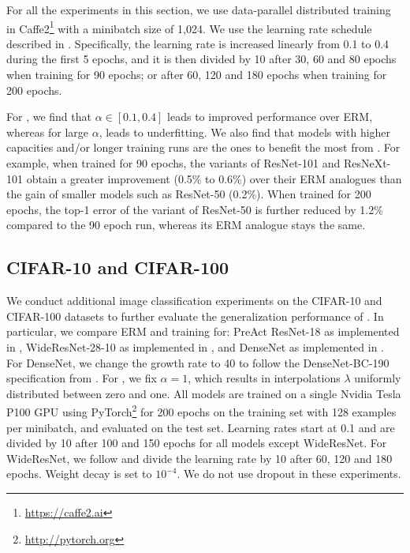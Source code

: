 For all the experiments in this section, we use data-parallel distributed
training in Caffe2\footnote{\url{https://caffe2.ai}} with a minibatch size of 1,024. We use the learning rate schedule
described in \citep{goyal2017accurate}. Specifically, the learning rate is
increased linearly from 0.1 to 0.4 during the first 5 epochs, and it is then
divided by 10 after 30, 60 and 80 epochs when training for 90 epochs; or after
60, 120 and 180 epochs when training for 200 epochs.

For \mixup{}, we find that $\alpha \in [0.1, 0.4]$ leads to improved
performance over ERM, whereas for large $\alpha$, \mixup{} leads to
underfitting. We also find that models with higher capacities and/or longer
training runs are the ones to benefit the most from \mixup{}. For example, when
trained for 90 epochs, the \mixup{} variants of ResNet-101 and ResNeXt-101
obtain a greater improvement (0.5\% to 0.6\%) over their ERM analogues than the
gain of smaller models such as ResNet-50 (0.2\%). When trained for 200 epochs,
the top-1 error of the \mixup{} variant of ResNet-50 is further reduced by
1.2\% compared to the 90 epoch run, whereas its ERM analogue stays the same.

\subsection{CIFAR-10 and CIFAR-100}
\label{sec:cifar}
We conduct additional image classification experiments on the CIFAR-10 and
CIFAR-100 datasets to further evaluate the generalization performance of
\mixup{}. In particular, we compare ERM and \mixup{} training for: PreAct
ResNet-18 \citep{he2016identity} as implemented in \citep{cifar-pytorch},
WideResNet-28-10 \citep{Zagoruyko2016WRN} as implemented in
\citep{wide-sergey}, and DenseNet \citep{huang2017densely} as implemented in
\citep{dense-andreas}. For DenseNet, we change the growth rate to 40 to follow
the DenseNet-BC-190 specification from \citep{huang2017densely}.  For \mixup{},
we fix $\alpha=1$, which results in interpolations $\lambda$ uniformly
distributed between zero and one. All models are trained on a single Nvidia
Tesla P100 GPU using PyTorch\footnote{\url{http://pytorch.org}} for 200 epochs on the training set with 128 examples per
minibatch, and evaluated on the test set. Learning rates start at 0.1 and are
divided by 10 after 100 and 150 epochs for all models except WideResNet. For
WideResNet, we follow \citep{Zagoruyko2016WRN} and divide the learning rate by
10 after 60, 120 and 180 epochs. Weight decay is set to $10^{-4}$. We do not
use dropout in these experiments.

